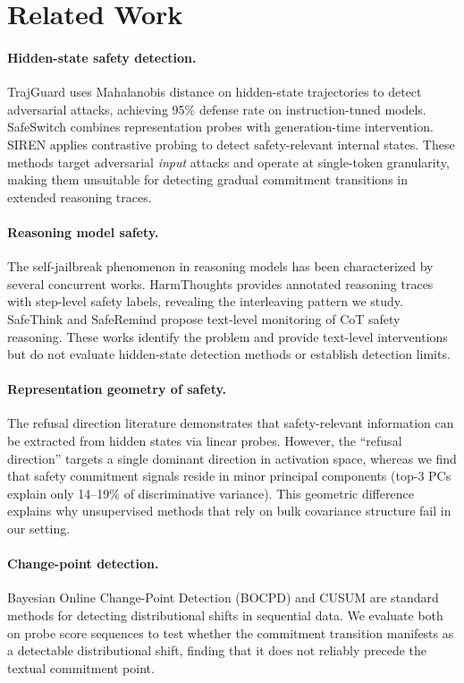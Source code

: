 \documentclass[11pt,a4paper]{article}
\begin{document}
\section{Related Work}

\paragraph{Hidden-state safety detection.} TrajGuard uses Mahalanobis distance on hidden-state trajectories to detect adversarial attacks, achieving 95\% defense rate on instruction-tuned models. SafeSwitch combines representation probes with generation-time intervention. SIREN applies contrastive probing to detect safety-relevant internal states. These methods target adversarial \emph{input} attacks and operate at single-token granularity, making them unsuitable for detecting gradual commitment transitions in extended reasoning traces.

\paragraph{Reasoning model safety.} The self-jailbreak phenomenon in reasoning models has been characterized by several concurrent works. HarmThoughts provides annotated reasoning traces with step-level safety labels, revealing the interleaving pattern we study. SafeThink and SafeRemind propose text-level monitoring of CoT safety reasoning. These works identify the problem and provide text-level interventions but do not evaluate hidden-state detection methods or establish detection limits.

\paragraph{Representation geometry of safety.} The refusal direction literature demonstrates that safety-relevant information can be extracted from hidden states via linear probes. However, the ``refusal direction'' targets a single dominant direction in activation space, whereas we find that safety commitment signals reside in minor principal components (top-3 PCs explain only 14--19\% of discriminative variance). This geometric difference explains why unsupervised methods that rely on bulk covariance structure fail in our setting.

\paragraph{Change-point detection.} Bayesian Online Change-Point Detection (BOCPD) and CUSUM are standard methods for detecting distributional shifts in sequential data. We evaluate both on probe score sequences to test whether the commitment transition manifests as a detectable distributional shift, finding that it does not reliably precede the textual commitment point.
\end{document}
